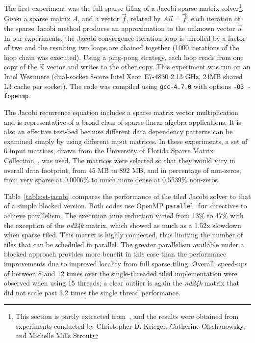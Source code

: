 The first experiment was the full sparse tiling of a Jacobi sparse matrix solver\footnote{This section is partly extracted from~\cite{st-paper}, and the results were obtained from experiments conducted by Christopher D. Krieger, Catherine Olschanowsky, and Michelle Mills Strout}. Given a sparse matrix $A$, and a vector $\vec{f}$, related by $A\vec{u}=\vec{f}$, each iteration of the sparse Jacobi method produces an approximation to the unknown vector $\vec{u}$. In our experiments, the Jacobi convergence iteration loop is unrolled by a factor of two and the resulting two loops are chained together (1000 iterations of the loop chain was executed). Using a ping-pong strategy, each loop reads from one copy of the $\vec{u}$ vector and writes to the other copy. This experiment was run on an Intel Westmere (dual-socket 8-core Intel Xeon E7-4830 2.13 GHz, 24MB shared L3 cache per socket). The code was compiled using {\tt gcc-4.7.0} with options {\tt -O3 -fopenmp}.

The Jacobi recurrence equation includes a sparse matrix vector multiplication and is representative of a broad class of sparse linear algebra applications. It is also an effective test-bed because different data dependency patterns can be examined simply by using different input matrices. In these experiments, a set of 6 input matrices, drawn from the University of Florida Sparse Matrix Collection~\cite{ST-MatrixMarket}, was used. The matrices were selected so that they would vary in overall data footprint, from 45 MB to 892 MB, and in percentage of non-zeros, from very sparse at 0.0006\% to much more dense at 0.5539\% non-zeros. %

Table~\ref{table:st-jacobi} compares the performance of the tiled Jacobi solver to that of a simple blocked version. Both codes use OpenMP \texttt{parallel for} directives to achieve parallelism. The execution time reduction varied from 13$\%$ to 47$\%$ with the exception of the {\em nd24k} matrix, which showed as much as a 1.52x slowdown when sparse tiled. This matrix is highly connected, thus limiting the number of tiles that can be scheduled in parallel. The greater parallelism available under a blocked approach provides more benefit in this case than the performance improvements due to improved locality from full sparse tiling. Overall, speed-ups of between 8 and 12 times over the single-threaded tiled implementation were observed when using 15 threads; a clear outlier is again the {\em nd24k} matrix that did not scale past 3.2 times the single thread performance.

